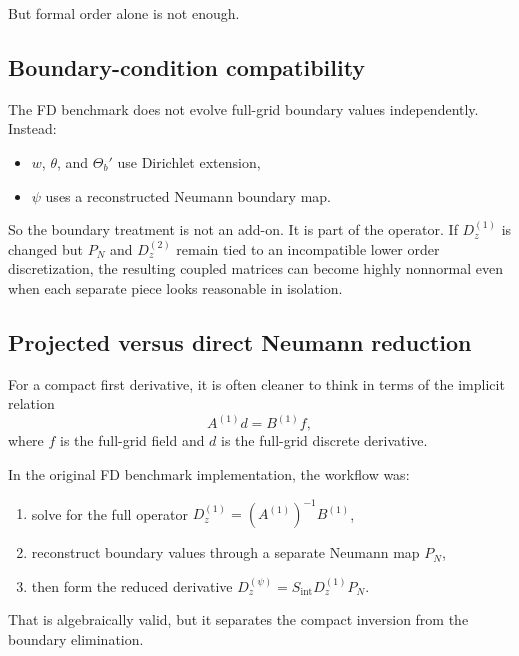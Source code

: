 \documentclass[11pt]{article}
\newcommand{\Dzone}{D^{(1)}_z}
\newcommand{\Dztwo}{D^{(2)}_z}
\newcommand{\Pmat}{P_N}
\begin{document}
But formal order alone is not enough.

\subsection{Boundary-condition compatibility}

The FD benchmark does not evolve full-grid boundary values independently.
Instead:
\begin{itemize}[nosep]
\item $w$, $\theta$, and $\Theta_b'$ use Dirichlet extension,
\item $\psi$ uses a reconstructed Neumann boundary map.
\end{itemize}

So the boundary treatment is not an add-on. It is part of the operator.
If $\Dzone$ is changed but $\Pmat$ and $\Dztwo$ remain tied to an incompatible lower
order discretization, the resulting coupled matrices can become highly
nonnormal even when each separate piece looks reasonable in isolation.

\subsection{Projected versus direct Neumann reduction}

For a compact first derivative, it is often cleaner to think in terms of the
implicit relation
\begin{equation}
\boxed{
A^{(1)} d = B^{(1)} f,
}
\end{equation}
where $f$ is the full-grid field and $d$ is the full-grid discrete derivative.

In the original FD benchmark implementation, the workflow was:
\begin{enumerate}[nosep]
\item solve for the full operator $\Dzone = (A^{(1)})^{-1} B^{(1)}$,
\item reconstruct boundary values through a separate Neumann map $\Pmat$,
\item then form the reduced derivative
  $D_z^{(\psi)} = S_{\mathrm{int}} \Dzone \Pmat$.
\end{enumerate}

That is algebraically valid, but it separates the compact inversion from the
boundary elimination.
\end{document}
